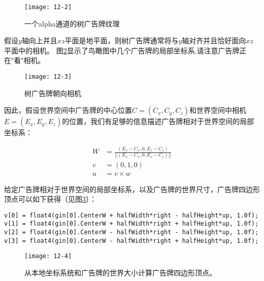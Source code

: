 \begin{figure}[h]
    \texttt{[image: 12-2]}
    \centering
    \caption{一个alpha通道的树广告牌纹理}
    \label{fig:12-2}
\end{figure}

\begin{flushleft}
假设$y$轴向上并且$xz$平面是地平面，则树广告牌通常将与$y$轴对齐并且恰好面向$xz$平面中的相机。 图\ref{fig:12-3}显示了鸟瞰图中几个广告牌的局部坐标系,请注意广告牌正在"看"相机。\\
\end{flushleft}

\begin{figure}[h]
    \texttt{[image: 12-3]}
    \centering
    \caption{树广告牌朝向相机}
    \label{fig:12-3}
\end{figure}

\begin{flushleft}
因此，假设世界空间中广告牌的中心位置$C=(C_{x},C_{y},C_{z})$和世界空间中相机$E=(E_{x},E_{y},E_{z})$的位置，我们有足够的信息描述广告牌相对于世界空间的局部坐标系：\\
\end{flushleft}

\begin{align*}
W&=\frac{(E_{x}-C_{x},0,E_{z}-C_{z})}{||(E_{x}-C_{x},0,E_{z}-C_{z})||}\\
v&=(0,1,0)\\
u&=v\times w
\end{align*}

\begin{flushleft}
给定广告牌相对于世界空间的局部坐标系，以及广告牌的世界尺寸，广告牌四边形顶点可以如下获得（见图\ref{fig:12-4}）：\\
\end{flushleft}

\begin{lstlisting}
v[0] = float4(gin[0].CenterW + halfWidth*right - halfHeight*up, 1.0f);
v[1] = float4(gin[0].CenterW + halfWidth*right + halfHeight*up, 1.0f);
v[2] = float4(gin[0].CenterW - halfWidth*right - halfHeight*up, 1.0f);
v[3] = float4(gin[0].CenterW - halfWidth*right + halfHeight*up, 1.0f);
\end{lstlisting}

\begin{figure}[h]
    \texttt{[image: 12-4]}
    \centering
    \caption{从本地坐标系统和广告牌的世界大小计算广告牌四边形顶点。}
    \label{fig:12-4}
\end{figure}

